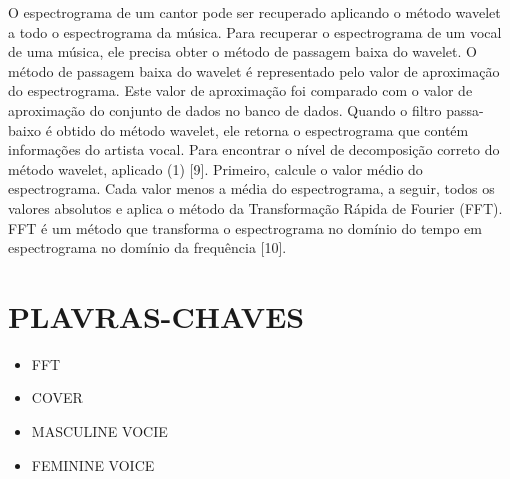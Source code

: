 \documentclass{article}
\begin{document}
O espectrograma de um cantor pode ser recuperado aplicando o método wavelet a todo o espectrograma da música. Para recuperar o espectrograma de um vocal de uma música, ele precisa obter o método de passagem baixa do wavelet. O método de passagem baixa do wavelet é representado pelo valor de aproximação do espectrograma. Este valor de aproximação foi comparado com o valor de aproximação do conjunto de dados no banco de dados.
Quando o filtro passa-baixo é obtido do método wavelet, ele retorna o espectrograma que contém informações do artista vocal.
Para encontrar o nível de decomposição correto do método wavelet, aplicado (1) [9]. Primeiro, calcule o valor médio do espectrograma. Cada valor menos a média do espectrograma, a seguir, todos os valores absolutos e aplica o método da Transformação Rápida de Fourier (FFT). FFT é um método que transforma o espectrograma no domínio do tempo em espectrograma no domínio da frequência [10].
\section{PLAVRAS-CHAVES}
\begin{itemize}
    \item FFT
    \item COVER 
    \item MASCULINE VOCIE
    \item FEMININE VOICE
\end{itemize}
\end{document}
